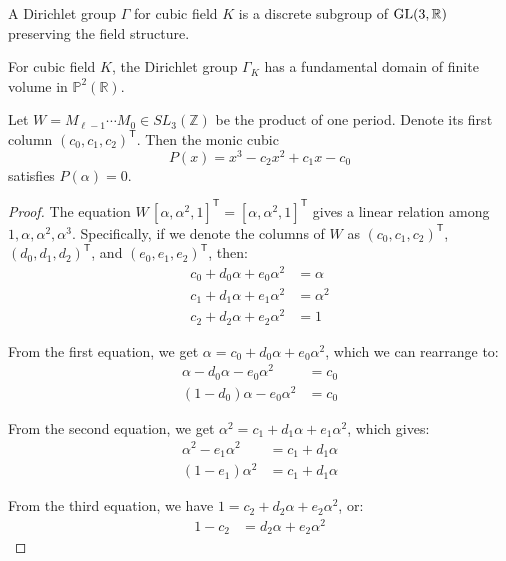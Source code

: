 \begin{theorem}
\begin{definition}
A Dirichlet group $\Gamma$ for cubic field $K$ is a discrete subgroup of $\operatorname{GL}(3,\mathbb{R})$ preserving the field structure.
\end{definition}

\begin{theorem}\label{thm:finite_domain}
For cubic field $K$, the Dirichlet group $\Gamma_K$ has a fundamental domain of finite volume in $\mathbb{P}^2(\mathbb{R})$.
\end{theorem}

\begin{lemma}\label{lem:polynomial_reconstruction}
Let $W=M_{\ell-1}\cdots M_{0}\in SL_{3}(\mathbb{Z})$ be the product of one period.
Denote its first column $(c_{0},c_{1},c_{2})^{\mathsf{T}}$.
Then the monic cubic
\[
P(x)=x^{3}-c_{2}x^{2}+c_{1}x-c_{0}
\]
satisfies $P(\alpha)=0$.
\end{lemma}

\begin{proof}
The equation $W\,[\alpha,\alpha^{2},1]^{\mathsf{T}}=[\alpha,\alpha^{2},1]^{\mathsf{T}}$ gives a linear relation among $1,\alpha,\alpha^{2},\alpha^{3}$. Specifically, if we denote the columns of $W$ as $(c_0, c_1, c_2)^{\mathsf{T}}$, $(d_0, d_1, d_2)^{\mathsf{T}}$, and $(e_0, e_1, e_2)^{\mathsf{T}}$, then:
\begin{align}
c_0 + d_0\alpha + e_0\alpha^2 &= \alpha\\
c_1 + d_1\alpha + e_1\alpha^2 &= \alpha^2\\
c_2 + d_2\alpha + e_2\alpha^2 &= 1
\end{align}

From the first equation, we get $\alpha = c_0 + d_0\alpha + e_0\alpha^2$, which we can rearrange to:
\begin{align}
\alpha - d_0\alpha - e_0\alpha^2 &= c_0\\
(1 - d_0)\alpha - e_0\alpha^2 &= c_0
\end{align}

From the second equation, we get $\alpha^2 = c_1 + d_1\alpha + e_1\alpha^2$, which gives:
\begin{align}
\alpha^2 - e_1\alpha^2 &= c_1 + d_1\alpha\\
(1 - e_1)\alpha^2 &= c_1 + d_1\alpha
\end{align}

From the third equation, we have $1 = c_2 + d_2\alpha + e_2\alpha^2$, or:
\begin{align}
1 - c_2 &= d_2\alpha + e_2\alpha^2
\end{align}


\end{proof}
\end{theorem}
